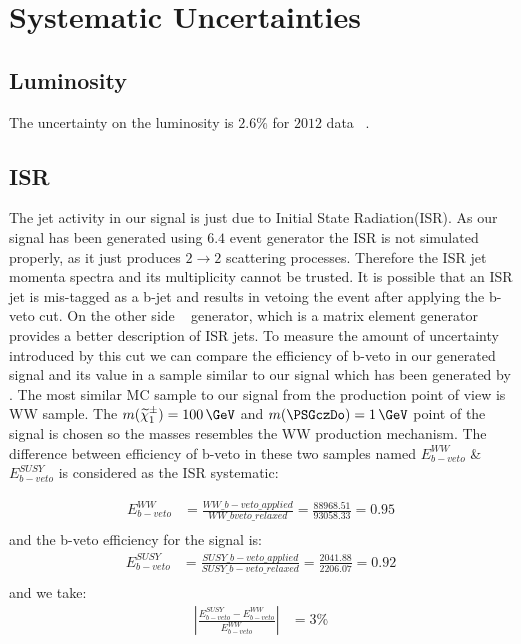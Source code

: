 \section{Systematic Uncertainties}
\label{sect:sys}
\subsection{Luminosity}
The uncertainty on the luminosity  is $2.6\%$ for $2012$ data ~\cite{LUMI}.

\subsection{ISR}
The jet activity in our signal is just due to Initial State Radiation(ISR). As our signal has been generated using \PYTHIA $6.4$ event generator the ISR is not simulated properly, as it just produces $2 \rightarrow 2$ scattering processes. Therefore the ISR jet momenta spectra and its multiplicity cannot be trusted. It is possible that an ISR jet is mis-tagged as a b-jet and results in vetoing the event after applying the b-veto cut. On the other side \MADGRAPH ~\cite{MADGRAPH} generator, which is a matrix element generator provides a better description of ISR jets. To measure the amount of uncertainty introduced by this cut we can compare the efficiency of b-veto in our generated signal and its value in a sample similar to our signal which has been generated by \MADGRAPH. 
The most similar MC sample to our signal from the production point of view is WW sample. The $m(\chione) = 100\,\GeV$ and $m(\PSGczDo) = 1\,\GeV$ point of the signal is chosen so the masses resembles the WW production mechanism. %
The difference between efficiency of b-veto in these two samples named $E^{WW}_{b-veto}$ \& $E^{SUSY}_{b-veto}$ is considered as the ISR systematic:


\begin{align}
E^{WW}_{b-veto} &= \frac{WW\_b-veto\_applied}{WW\_bveto\_relaxed} = \frac{88968.51}{93058.33} = 0.95\\ \nonumber
\end{align}
and the b-veto efficiency for the signal is:
\begin{align}
E^{SUSY}_{b-veto} &= \frac{SUSY\_b-veto\_ applied}{SUSY\_b-veto\_ relaxed} = \frac{2041.88}{2206.07} = 0.92 \\ \nonumber
\end{align}
and we take:
\begin{align}
|\frac{E^{SUSY}_{b-veto}-E^{WW}_{b-veto}}{E^{WW}_{b-veto}}| &= 3 \% \\ \nonumber
\end{align}

